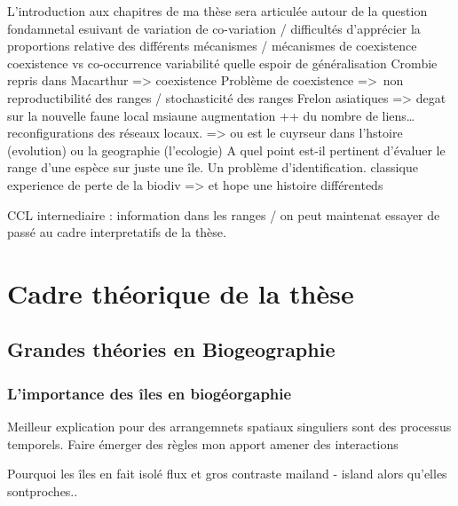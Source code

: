 L'introduction aux chapitres de ma thèse sera articulée autour de la
question fondamnetal esuivant de variation de co-variation / difficultés
d'apprécier la proportions relative des différents mécanismes /
mécanismes de coexistence coexistence vs co-occurrence variabilité
quelle espoir de généralisation Crombie repris dans Macarthur
=\textgreater{} coexistence Problème de coexistence =\textgreater{}~non
reproductibilité des ranges / stochasticité des ranges Frelon asiatiques
=\textgreater{} degat sur la nouvelle faune local msiaune augmentation
++ du nombre de liens\ldots{} reconfigurations des réseaux locaux.
=\textgreater{} ou est le cuyrseur dans l'hstoire (evolution) ou la
geographie (l'ecologie) A quel point est-il pertinent d'évaluer le range
d'une espèce sur juste une île. Un problème d'identification. classique
experience de perte de la biodiv =\textgreater{} et hope une histoire
différenteds

CCL internediaire : information dans les ranges / on peut maintenat
essayer de passé au cadre interpretatifs de la thèse.

\section*{Cadre théorique de la
thèse}\label{cadre-thuxe9orique-de-la-thuxe8se}

\subsection{Grandes théories en
Biogeographie}\label{grandes-thuxe9ories-en-biogeographie}

\subsubsection{L'importance des îles en
biogéorgaphie}\label{limportance-des-uxeeles-en-bioguxe9orgaphie}

Meilleur explication pour des arrangemnets spatiaux singuliers sont des
processus temporels. Faire émerger des règles mon apport amener des
interactions

Pourquoi les îles en fait isolé flux et gros contraste mailand - island
alors qu'elles sontproches..

